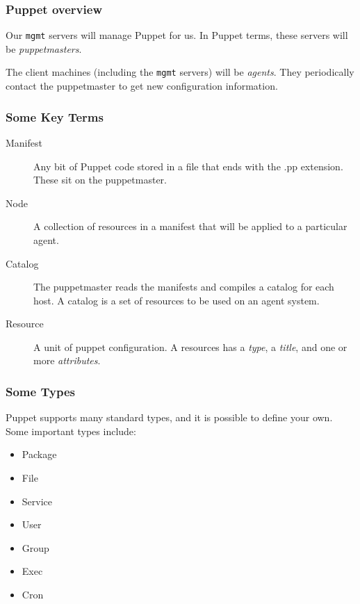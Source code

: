\documentclass[10pt]{beamer}
\begin{document}
\begin{frame}
  \frametitle{Puppet overview}

  Our \texttt{mgmt} servers will manage Puppet for us.  In Puppet terms, these servers will be \emph{puppetmasters}.
  
  The client machines (including the \texttt{mgmt} servers) will be \emph{agents}.  They periodically contact the puppetmaster to get new configuration information.
  
\end{frame}
\begin{frame}
  \frametitle{Some Key Terms}

 \begin{description}
  \item[Manifest] Any bit of Puppet code stored in a file that ends with the .pp extension.  These sit on the puppetmaster.
  \item[Node] A collection of resources in a manifest that will be applied to a particular agent.
  \item[Catalog] The puppetmaster reads the manifests and compiles a catalog for each host. A catalog is a set of resources to be used on an agent system.
  \item[Resource]A unit of puppet configuration.  A resources has a \emph{type}, a \emph{title}, and one or more \emph{attributes}.

  \end{description}

\end{frame}
\begin{frame}
  \frametitle{Some Types}

Puppet supports many standard types, and it is possible to define your own.  Some important types include:
\begin{itemize}
\item Package
\item File
\item Service
\item User
\item Group
\item Exec
\item Cron
\end{itemize}


\end{frame}
\end{document}
